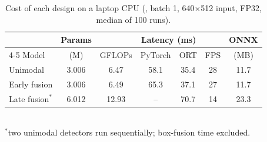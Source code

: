 \begin{table}[t]\centering\caption{Cost of each design on a laptop CPU (\BenchCPU{}, batch 1, 640$\times$512 input, FP32, median of 100 runs).}\label{tab:eff}
\setlength{\tabcolsep}{2.5pt}\footnotesize
\begin{tabular}{@{}lcccccc@{}}\toprule
& Params & & \multicolumn{2}{c}{Latency (ms)} & & ONNX \\ \cmidrule(lr){4-5}
Model & (M) & GFLOPs & PyTorch & ORT & FPS & (MB) \\ \midrule
Unimodal & 3.006 & 6.47 & 58.1 & 35.4 & 28 & 11.7 \\
Early fusion & 3.006 & 6.49 & 65.3 & 37.1 & 27 & 11.7 \\
Late fusion$^\ast$ &6.012 & 12.93 & -- & 70.7 & 14 & 23.3 \\
\bottomrule\end{tabular}
\\[2pt]{\scriptsize $^\ast$two unimodal detectors run sequentially; box-fusion time excluded.}
\end{table}

